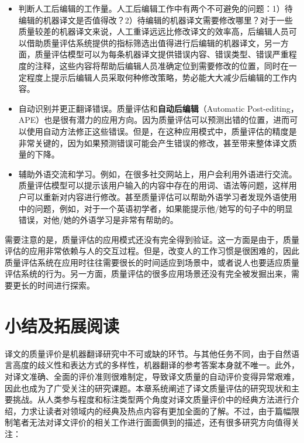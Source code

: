 \begin{itemize}
\vspace{0.5em}
\item 判断人工后编辑的工作量。人工后编辑工作中有两个不可避免的问题：1）待编辑的机器译文是否值得改？2）待编辑的机器译文需要修改哪里？对于一些质量较差的机器译文来说，人工重译远远比修改译文的效率高，后编辑人员可以借助质量评估系统提供的指标筛选出值得进行后编辑的机器译文，另一方面，质量评估模型可以为每条机器译文提供{错误内容、错误类型、错误严重程度}的注释，这些内容将帮助后编辑人员准确定位到需要修改的位置，同时在一定程度上提示后编辑人员采取何种修改策略，势必能大大减少后编辑的工作内容。
\vspace{0.5em}
\item 自动识别并更正翻译错误。质量评估和{\small\sffamily\bfseries{自动后编辑}}（Automatic Post-editing，APE）也是很有潜力的应用方向。因为质量评估可以预测出错的位置，进而可以使用自动方法修正这些错误。但是，在这种应用模式中，质量评估的精度是非常关键的，因为如果预测错误可能会产生错误的修改，甚至带来整体译文质量的下降。
\vspace{0.5em}
\item 辅助外语交流和学习。例如，在很多社交网站上，用户会利用外语进行交流。质量评估模型可以提示该用户输入的内容中存在的用词、语法等问题，这样用户可以重新对内容进行修改。甚至质量评估可以帮助外语学习者发现外语使用中的问题，例如，对于一个英语初学者，如果能提示他/她写的句子中的明显错误，对他/她的外语学习是非常有帮助的。
\vspace{0.5em}
\end{itemize}

\parinterval 需要注意的是，质量评估的应用模式还没有完全得到验证。这一方面是由于，质量评估的应用非常依赖与人的交互过程。但是，改变人的工作习惯是很困难的，因此质量评估系统在应用时往往需要很长的时间适应到场景中，或者说人也要适应质量评估系统的行为。另一方面，质量评估的很多应用场景还没有完全被发掘出来，需要更长的时间进行探索。


\sectionnewpage
\section{小结及拓展阅读}

\parinterval 译文的质量评价是机器翻译研究中不可或缺的环节。与其他任务不同，由于自然语言高度的歧义性和表达方式的多样性，机器翻译的参考答案本身就不唯一。此外，对译文准确、全面的评价准则很难制定，导致译文质量的自动评价变得异常艰难，因此也成为了广受关注的研究课题。本章系统阐述了译文质量评估的研究现状和主要挑战。从人类参与程度和标注类型两个角度对译文质量评价中的经典方法进行介绍，力求让读者对领域内的经典及热点内容有更加全面的了解。不过，由于篇幅限制笔者无法对译文评价的相关工作进行面面俱到的描述，还有很多研究方向值得关注：

